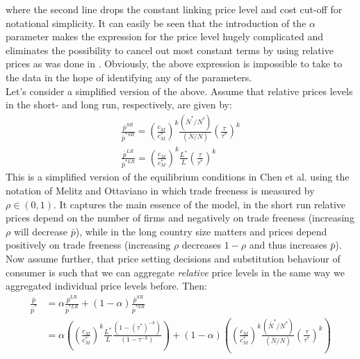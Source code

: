 where the second line drops the constant linking price level and cost cut-off for notational simplicity. It can easily be seen that the introduction of the $\alpha$ parameter makes the expression for the price level hugely complicated and eliminates the possibility to cancel out most constant terms by using relative prices as was done in \citet{Chen2009}. Obviously, the above expression is impossible to take to the data in the hope of identifying any of the parameters. \\
Let's consider a simplified version of the above. Assume that relative prices levels in the short- and long run, respectively, are given by:
\begin{align*}
\frac{\bar{p}^{SR}}{\bar{p}^{*SR}} = \left( \frac{c_M}{c_M^*} \right)^k \frac{(\bar{N}^* / N^*)}{(\bar{N} / N)} \left(\frac{\tau}{\tau^*}\right)^k \\
\frac{\bar{p}^{LR}}{\bar{p}^{*LR}} = \left( \frac{c_M}{c_M^*} \right)^k \frac{L^*}{L} \left(\frac{\tau}{\tau^*}\right)^k
\end{align*}
This is a simplified version of the equilibrium conditions in Chen et al. using the notation of Melitz and Ottaviano in which trade freeness is measured by $\rho \in (0,1)$. It captures the main essence of the model, in the short run relative prices depend on the number of firms and negatively on trade freeness (increasing $\rho$ will decrease $\bar{p}$), while in the long country size matters and prices depend positively on trade freeness (increasing $\rho$ decreases $1-\rho$ and thus increases $\bar{p}$). Now assume further, that price setting decisions and substitution behaviour of consumer is such that we can aggregate \textit{relative} price levels in the same way we aggregated individual price levels before. Then:
\begin{align*}
\frac{\bar{p}}{\bar{p}^*} &= \alpha \frac{\bar{p}^{LR}}{\bar{p}^{*LR}} + (1-\alpha) \frac{\bar{p}^{SR}}{\bar{p}^{*SR}} \\
													&= \alpha \left( \left( \frac{c_M}{c_M^*} \right)^k \frac{L^*}{L} \frac{(1-(\tau^*)^{-k})}{(1-\tau^{-k})} \right) + (1-\alpha) \left( \left( \frac{c_M}{c_M^*} \right)^k \frac{(\bar{N}^* / N^*)}{(\bar{N} / N)} \left(\frac{\tau}{\tau^*}\right)^k \right)
\end{align*}
